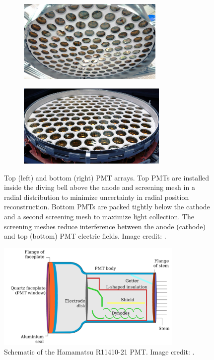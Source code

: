 \begin{figure}
    \centering
    \begin{subfigure}[t]{0.5\textwidth}
        \centering
        \includegraphics[height=4cm]{PMTTopArray}
    \end{subfigure}%
    \begin{subfigure}[t]{0.5\textwidth}
        \centering
        \includegraphics[height=4cm]{PMTBottomArray}
    \end{subfigure}
    \caption[Top and bottom PMT arrays.]{Top (left) and bottom (right) PMT arrays.  Top PMTs are installed inside the diving bell above the
    anode and screening mesh in a radial distribution
    to minimize uncertainty in radial position reconstruction.  Bottom PMTs are packed tightly below the cathode and a second screening
    mesh
    to maximize light collection.  The screening meshes reduce interference between the anode (cathode) and top (bottom) PMT electric
    fields.  Image credit: .}
	\label{fig:xenon1t_pmt_array}
\end{figure}

\begin{figure}
\centering
\includegraphics[width=0.8\textwidth]{PMTSchematic}
\caption{Schematic of the Hamamatsu R11410-21 PMT.  Image credit: .}
\label{fig:xenon1t_hamamatsu_pmt}
\end{figure}

